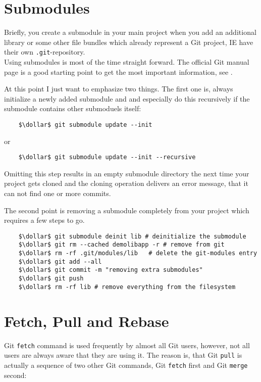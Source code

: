 \section{Submodules}
\label{chapter:Miscellaneous.3}

Briefly, you create a submodule in your main project when you add an additional library or some other file 
bundles which already represent a Git project, \ac{IE} have their own \verb|.git|-repository.
\\
Using submodules is most of the time straight forward. The official Git manual page is a good starting point 
to get the most important information, see \cite{Unknown2021Git-Tools-Submodule}.

At this point I just want to emphasize two things. The first one is, always initialize a newly added submodule
and and especially do this recursively if the submodule contains other submoduels itself:
\begin{lstlisting}
	$\dollar$ git submodule update --init
\end{lstlisting}  
or
\begin{lstlisting}
	$\dollar$ git submodule update --init --recursive
\end{lstlisting}
Omitting this step results in an empty submodule directory the next time your project gets cloned and the 
cloning operation delivers an error message, that it can not find one or more commits.

The second point is removing a submodule completely from your project which requires a few steps to go.

\begin{lstlisting}
	$\dollar$ git submodule deinit lib # deinitialize the submodule
	$\dollar$ git rm --cached demolibapp -r # remove from git
	$\dollar$ rm -rf .git/modules/lib	# delete the git-modules entry
	$\dollar$ git add --all
	$\dollar$ git commit -m "removing extra submodules"
	$\dollar$ git push
	$\dollar$ rm -rf lib # remove everything from the filesystem	
\end{lstlisting}



\section{Fetch, Pull and Rebase}
\label{chapter:Miscellaneous.4}

Git \verb*|fetch| command is used frequently by almost all Git users, however, not all users are always aware that they 
are using it. The reason is, that Git \verb*|pull| is actually a sequence of two other Git commands, Git \verb*|fetch|
first and Git \verb*|merge| second:

